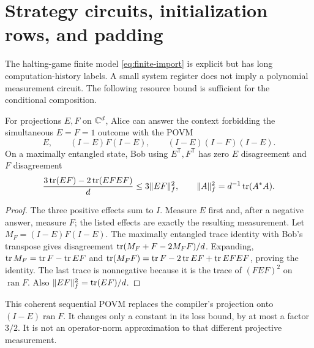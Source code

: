 \section{Strategy circuits, initialization rows, and padding}\label{sec:circuits}
The halting-game finite model \eqref{eq:finite-import} is explicit but
has long computation-history labels. A small system register does not
imply a polynomial measurement circuit. The following resource bound
is sufficient for the conditional composition.

\begin{lemma}\label{lem:sequential}
For projections $E,F$ on $\mathbb C^d$, Alice can answer the context forbidding
the simultaneous $E=F=1$ outcome with the POVM
\[
 E,\qquad (I-E)F(I-E),\qquad (I-E)(I-F)(I-E).
\]
On a maximally entangled state, Bob using $E^{\mathsf T},F^{\mathsf T}$
has zero $E$ disagreement and $F$ disagreement
\begin{equation}\label{eq:sequential}
 \frac{3\operatorname{tr}(EF)-2\operatorname{tr}(EFEF)}d\leq3\lVert EF\rVert_f^2,
 \qquad \lVert A\rVert_f^2=d^{-1}\operatorname{tr}(A^*A).
\end{equation}
\end{lemma}
\begin{proof}
The three positive effects sum to $I$. Measure $E$ first and, after
a negative answer, measure $F$; the listed effects are exactly the
resulting measurement. Let $M_F=(I-E)F(I-E)$. The maximally entangled
trace identity with Bob's transpose gives disagreement
$\operatorname{tr}(M_F+F-2M_FF)/d$. Expanding,
$\operatorname{tr} M_F=\operatorname{tr} F-\operatorname{tr} EF$ and
$\operatorname{tr}(M_FF)=\operatorname{tr} F-2\operatorname{tr} EF+\operatorname{tr} EFEF$, proving the identity.
The last trace is nonnegative because it is the trace of $(FEF)^2$
on $\operatorname{ran}F$. Also $\lVert EF\rVert_f^2=\operatorname{tr}(EF)/d$.
\end{proof}
This coherent sequential POVM replaces the compiler's projection onto
$(I-E)\operatorname{ran}F$. It changes only a constant in its loss
bound, by at most a factor $3/2$. It is not an operator-norm
approximation to that different projective measurement.

